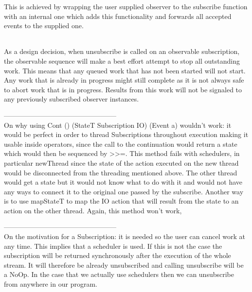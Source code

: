This is achieved by wrapping the user supplied observer to the subscribe function with an internal one which adds this functionality and forwards all accepted events to the supplied one.

\\

As a design decision, when unsubscribe is called on an observable subscription, the observable sequence will make a best effort attempt to stop all outstanding work. This means that any queued work that has not been started will not start. Any work that is already in progress might still complete as it is not always safe to abort work that is in progress. Results from this work will not be signaled to any previously subscribed observer instances.



--------------------------------------------------\\
On why using Cont () (StateT Subscription IO) (Event a) wouldn't work: it would be perfect in order to thread Subscriptions throughout execution making it usable inside operators, since the call to the continuation would return a state which would then be sequenced by >>=. This method fails with schedulers, in particular newThread since the state of the action executed on the new thread would be disconnected from the threading mentioned above. The other thread would get a state but it would not know what to do with it and would not have any ways to connect it to the original one passed by the subscribe. Another way is to use mapStateT to map the IO action that will result from the state to an action on the other thread. Again, this method won't work, 

--------------------------------------------------\\
On the motivation for a Subscription: it is needed so the user can cancel work at any time. This implies that a scheduler is used. If this is not the case the subscription will be returned synchronously after the execution of the whole stream. It will therefore be already unsubscribed and calling unsubscribe will be a NoOp. In the case that we actually use schedulers then we can unsubscribe from anywhere in our program. 

